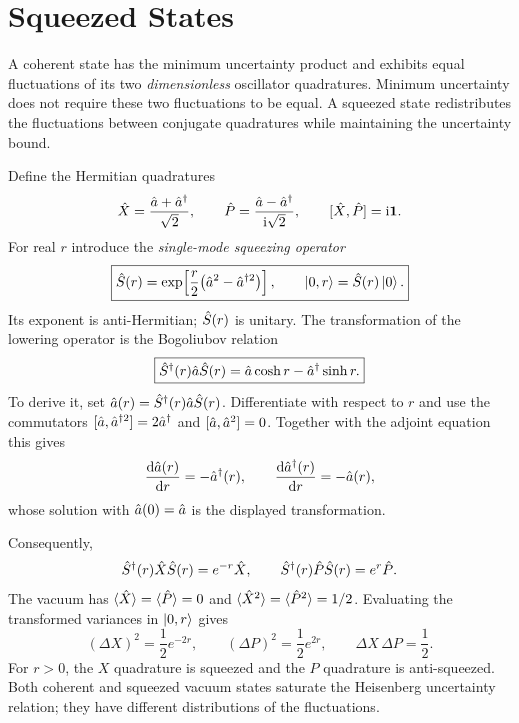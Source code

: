 \section{Squeezed States}

A coherent state has the minimum uncertainty product and exhibits equal fluctuations of its two \emph{dimensionless} oscillator quadratures. Minimum uncertainty does not require these two fluctuations to be equal. A squeezed state redistributes the fluctuations between conjugate quadratures while maintaining the uncertainty bound.

Define the Hermitian quadratures
\begin{equation}
\hat{X}=\frac{\hat{a}+\hat{a}^\dagger}{\sqrt2},\qquad
\hat{P}=\frac{\hat{a}-\hat{a}^\dagger}{\mathrm{i}\sqrt2},\qquad
[\hat{X},\hat{P}]=\mathrm{i}\mathbf1.
\end{equation}
For real $r$ introduce the \emph{single-mode squeezing operator}
\begin{equation}
\boxed{\hat{S}(r)=\exp\!\left[\frac r2
       \bigl(\hat{a}^{2}-\hat{a}^{\dagger2}\bigr)\right],\qquad
  \left|0,r\right\rangle=\hat{S}(r)\left|0\right\rangle.}
\end{equation}
Its exponent is anti-Hermitian; $\hat{S}(r)$ is unitary. The transformation of the lowering operator is the Bogoliubov relation
\begin{equation}
\boxed{\hat{S}^\dagger(r)\hat{a}\hat{S}(r)
   =\hat{a}\cosh r-\hat{a}^\dagger\sinh r.}
\end{equation}
To derive it, set $\hat{a}(r)=\hat{S}^\dagger(r)\hat{a}\hat{S}(r)$. Differentiate with respect to $r$ and use the commutators $[\hat{a},\hat{a}^{\dagger2}]=2\hat{a}^\dagger$ and $[\hat{a},\hat{a}^2]=0$. Together with the adjoint equation this gives
\begin{equation}
\frac{\mathrm{d}\hat{a}(r)}{\mathrm{d} r}=-\hat{a}^\dagger(r),\qquad
\frac{\mathrm{d}\hat{a}^\dagger(r)}{\mathrm{d} r}=-\hat{a}(r),
\end{equation}
whose solution with $\hat{a}(0)=\hat{a}$ is the displayed transformation.

Consequently,
\begin{equation}
\hat{S}^\dagger(r)\hat{X}\hat{S}(r)=e^{-r}\hat{X},\qquad
  \hat{S}^\dagger(r)\hat{P}\hat{S}(r)=e^{r}\hat{P}.
\end{equation}
The vacuum has $\langle\hat{X}\rangle=\langle\hat{P}\rangle=0$ and $\langle\hat{X}^2\rangle=\langle\hat{P}^2\rangle=1/2$. Evaluating the transformed variances in $\left|0,r\right\rangle$ gives
\begin{equation}
\boxed{(\Delta X)^2=\frac12e^{-2r},\qquad
        (\Delta P)^2=\frac12e^{2r},\qquad
        \Delta X\,\Delta P=\frac12.}
\end{equation}
For $r>0$, the $X$ quadrature is squeezed and the $P$ quadrature is anti-squeezed. Both coherent and squeezed vacuum states saturate the Heisenberg uncertainty relation; they have different distributions of the fluctuations.


